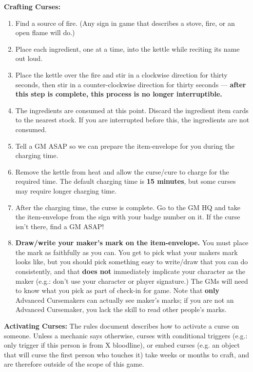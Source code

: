 \documentclass[green]{GL2020}
\begin{document}
\textbf{Crafting Curses:}
\begin{enumerate}
	\item Find a source of fire. (Any sign in game that describes a stove, fire, or an open flame will do.)
	\item Place each ingredient, one at a time, into the kettle while reciting its name out loud. 
	\item Place the kettle over the fire and stir in a clockwise direction for thirty seconds, then stir in a counter-clockwise direction for thirty seconds —\textbf{ after this step is complete, this process is no longer interruptible.}
	\item The ingredients are consumed at this point. Discard the ingredient item cards to the nearest stock. If you are interrupted before this, the ingredients are not consumed.
	\item Tell a GM ASAP so we can prepare the item-envelope for you during the charging time.
	\item Remove the kettle from heat and allow the curse/cure to charge for the required time. The default charging time is \textbf{15 minutes}, but some curses may require longer charging time.
	\item After the charging time, the curse is complete. Go to the GM HQ and take the item-envelope from the sign with your badge number on it. If the curse isn’t there, find a GM ASAP!
	\item \textbf{Draw/write your maker's mark on the item-envelope.} You must place the mark as faithfully as you can. You get to pick what your makers mark looks like, but you should pick something easy to write/draw that you can do consistently, and that \textbf{does not} immediately implicate your character as the maker (e.g.: don’t use your character or player signature.) The GMs will need to know what you pick as part of check-in for game. Note that \textbf{only} Advanced Cursemakers can actually see maker’s marks; if you are not an Advanced Cursemaker, you lack the skill to read other people's marks.
\end{enumerate}

\textbf{Activating Curses:}
The rules document describes how to activate a curse on someone. Unless a mechanic says otherwise, curses with conditional triggers (e.g.: only trigger if this person is from X bloodline), or embed curses (e.g. an object that will curse the first person who touches it) take weeks or months to craft, and are therefore outside of the scope of this game.
\end{document}
